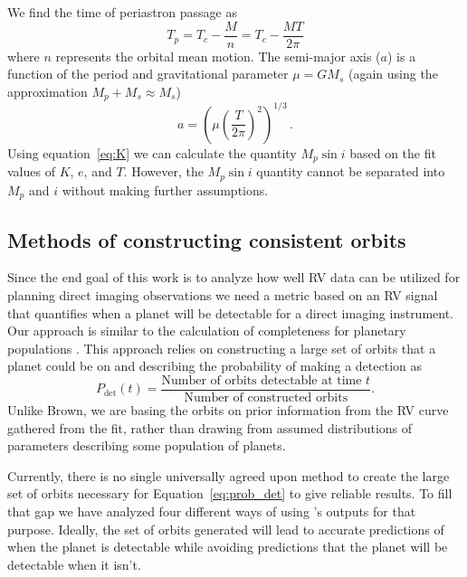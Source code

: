 We find the time of periastron passage as
\begin{equation}
    T_p = T_c - \frac{M}{n} = T_c - \frac{M T}{2\pi}
\end{equation}
where $n$ represents the orbital mean motion.
The semi-major axis ($a$) is a function of the period and gravitational parameter $\mu=G M_s$ (again using
the approximation $M_p + M_s \approx M_s$)
\begin{equation}
    a = {\left( \mu {\left(\frac{ T}{2\pi}\right)}^2 \right)}^{1/3} \,.
\end{equation}
Using equation~\ref{eq:K} we can calculate the quantity $M_p\sin{i}$ based on the fit values of $K$,
$e$, and $T$. However, the $M_p \sin{i}$ quantity cannot be separated into $M_p$ and $i$ without
making further assumptions.

\subsection{Methods of constructing consistent orbits}\label{sec:orbit_methods}
Since the end goal of this work is to analyze how well RV data can be utilized for planning direct imaging observations we
need a metric based on an RV signal that quantifies when a planet will be detectable for a direct
imaging instrument.  Our approach is similar to the calculation of completeness for planetary
populations \citep{brownObscurationalCompleteness2004,
brownSingleVisitPhotometric2005, brownNewCompletenessMethods2010,garrettAnalyticalFormulation2016}.
This approach relies on constructing a
large set of orbits that a planet could be on and describing the probability of making a detection
as 
\begin{equation}\label{eq:prob_det}
    P_{\textrm{det}}(t) = \frac{\textrm{Number of orbits detectable at time $t$}}{\textrm{Number of
    constructed orbits}}
.\end{equation}
Unlike Brown, we are basing the orbits on prior information from the RV curve gathered from the 
 fit, rather than drawing from assumed distributions of parameters describing some population
of planets.

Currently, there is no single universally agreed upon method to create the large set of orbits
necessary for Equation~\ref{eq:prob_det} to give reliable results. To fill that gap we have analyzed
four different ways of using 's outputs for that purpose. Ideally, the set of orbits
generated will lead to accurate predictions of when the planet is detectable while avoiding
predictions that the planet will be detectable when it isn't.

